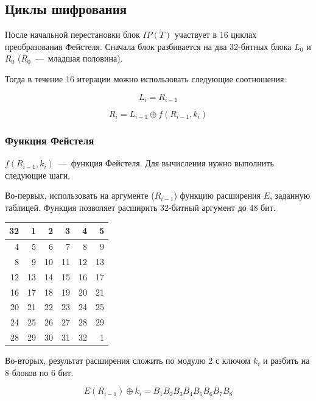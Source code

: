 \subsection{Циклы шифрования}

После начальной перестановки блок $IP(T)$ участвует в 16 циклах преобразования Фейстеля. Сначала блок разбивается на два 32-битных блока $L_0$ и $R_0$ ($R_0$~---~младшая половина).

Тогда в течение 16 итерации можно использовать следующие соотношения:

\begin{equation*}
	L_i = R_{i-1}
\end{equation*}

\begin{equation*}
	R_i = L_{i-1} \oplus f(R_{i-1}, k_i)
\end{equation*}


\subsubsection{Функция Фейстеля}

$f(R_{i-1}, k_i)$~---~функция Фейстеля. Для вычисления нужно выполнить следующие шаги.

Во-первых, использовать на аргументе ($R_{i-1}$) функцию расширения $E$, заданную таблицей. Функция позволяет расширить 32-битный аргумент до 48 бит.

\begin{center}
\begin{tabular}{|r|r|r|r|r|r|} 
 \hline
32 & 1 & 2 & 3 & 4 & 5 \\ \hline
4 & 5 & 6 & 7 & 8 & 9 \\ \hline
8 & 9 & 10 & 11 & 12 & 13 \\ \hline
12 & 13 & 14 & 15 & 16 & 17 \\ \hline
16 & 17 & 18 & 19 & 20 & 21 \\ \hline
20 & 21 & 22 & 23 & 24 & 25 \\ \hline
24 & 25 & 26 & 27 & 28 & 29 \\ \hline
28 & 29 & 30 & 31 & 32 & 1 \\ \hline
\end{tabular}
\end{center}


Во-вторых, результат расширения сложить по модулю 2 с ключом $k_i$ и разбить на 8 блоков по 6 бит.

\begin{equation*}
	E(R_{i-1}) \oplus k_i = B_1B_2B_3B_4B_5B_6B_7B_8
\end{equation*}

